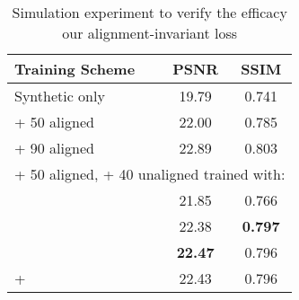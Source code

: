 \documentclass[10pt,twocolumn,letterpaper]{article}
\begin{document}
\begin{table}[t]
\centering
\caption{Simulation experiment to verify the efficacy our alignment-invariant loss}
\footnotesize
\begin{tabular}{lcc} 
		\toprule
		Training Scheme & PSNR & SSIM  \\ 
		\midrule
		Synthetic only & 19.79 & 0.741 \\ \hline
		+ 50 aligned & 22.00 &  0.785 \\ \hline		
		+ 90 aligned & 22.89 & 0.803 \\ \hline		
		\midrule
		\multicolumn{3}{c}{+ 50 aligned, + 40 unaligned trained with:} \vspace{3pt}\\
 & 21.85 &  0.766 \\ \hline
		 & 22.38 & \textbf{0.797}   \\ \hline		
		 & \textbf{22.47} &  0.796 \\ \hline		
		 +  & 22.43 & 0.796 \\ \hline
\bottomrule
\end{tabular}
\label{tb:unalignedLoss}
\end{table}
\end{document}
